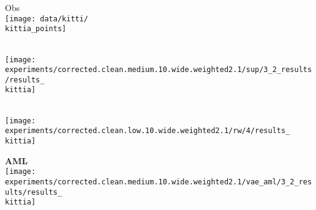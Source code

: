 {\footnotesize
\newcommand{\kittia}{0}
\newcommand{\kittib}{612}
\newcommand{\kittic}{1224}
\newcommand{\kittid}{2754}
\newcommand{\kittie}{3060}
\newcommand{\kittif}{5508} %

\begin{minipage}[t]{0.03\textwidth}
    \vspace{0px}\centering
    \vspace{5mm}
\end{minipage}
\begin{minipage}[t]{0.145\textwidth}
	\vspace{0px}\centering
    \hspace*{2mm}
	Obs\\[-1px]
	\texttt{[image: data/kitti/\\kittia\_points]}
\end{minipage}
\begin{minipage}[t]{0.145\textwidth}
	\vspace{0px}\centering
    \hspace*{2mm}
	\cite{Dai2017CVPRa}\\[-1px]
	\texttt{[image: experiments/corrected.clean.medium.10.wide.weighted2.1/sup/3\_2\_results/results\_\\kittia]}
\end{minipage}
\begin{minipage}[t]{0.145\textwidth}
	\vspace{0px}\centering
    \hspace*{2mm}
	\cite{Engelmann2016GCPR}\\[-1px]
	\texttt{[image: experiments/corrected.clean.low.10.wide.weighted2.1/rw/4/results\_\\kittia]}
\end{minipage}
\begin{minipage}[t]{0.145\textwidth}
	\vspace{0px}\centering
    \hspace*{2mm}
	{\bf\color{MPIIorange} AML}\\[-1px]
	\texttt{[image: experiments/corrected.clean.medium.10.wide.weighted2.1/vae\_aml/3\_2\_results/results\_\\kittia]}
\end{minipage}
\begin{minipage}[t]{0.145\textwidth}
	\vspace{0px}\centering

\end{minipage}}
